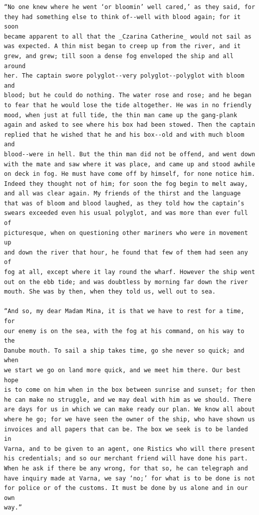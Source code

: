 \documentclass{article}
\begin{document}
\begin{verbatim}
“No one knew where he went ‘or bloomin’ well cared,’ as they said, for
they had something else to think of--well with blood again; for it soon
became apparent to all that the _Czarina Catherine_ would not sail as
was expected. A thin mist began to creep up from the river, and it
grew, and grew; till soon a dense fog enveloped the ship and all around
her. The captain swore polyglot--very polyglot--polyglot with bloom and
blood; but he could do nothing. The water rose and rose; and he began
to fear that he would lose the tide altogether. He was in no friendly
mood, when just at full tide, the thin man came up the gang-plank
again and asked to see where his box had been stowed. Then the captain
replied that he wished that he and his box--old and with much bloom and
blood--were in hell. But the thin man did not be offend, and went down
with the mate and saw where it was place, and came up and stood awhile
on deck in fog. He must have come off by himself, for none notice him.
Indeed they thought not of him; for soon the fog begin to melt away,
and all was clear again. My friends of the thirst and the language
that was of bloom and blood laughed, as they told how the captain’s
swears exceeded even his usual polyglot, and was more than ever full of
picturesque, when on questioning other mariners who were in movement up
and down the river that hour, he found that few of them had seen any of
fog at all, except where it lay round the wharf. However the ship went
out on the ebb tide; and was doubtless by morning far down the river
mouth. She was by then, when they told us, well out to sea.

“And so, my dear Madam Mina, it is that we have to rest for a time, for
our enemy is on the sea, with the fog at his command, on his way to the
Danube mouth. To sail a ship takes time, go she never so quick; and when
we start we go on land more quick, and we meet him there. Our best hope
is to come on him when in the box between sunrise and sunset; for then
he can make no struggle, and we may deal with him as we should. There
are days for us in which we can make ready our plan. We know all about
where he go; for we have seen the owner of the ship, who have shown us
invoices and all papers that can be. The box we seek is to be landed in
Varna, and to be given to an agent, one Ristics who will there present
his credentials; and so our merchant friend will have done his part.
When he ask if there be any wrong, for that so, he can telegraph and
have inquiry made at Varna, we say ‘no;’ for what is to be done is not
for police or of the customs. It must be done by us alone and in our own
way.”


\end{verbatim}
\end{document}
